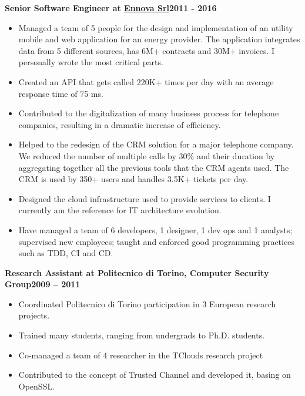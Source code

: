 \documentclass[a4paper,sans,10pt]{moderncv} %
\begin{document}
\vspace{0.5em}
\textbf{Senior Software Engineer at \href{https://www.ennova.it}{Ennova Srl}}\hfill\textbf{2011 - 2016}\\
\vspace{-1em}
  \begin{itemize}
  \item Managed a team of 5 people for the design and implementation of an utility mobile and web application for an energy provider.
  The application integrates data from 5 different sources, has 6M+ contracts and 30M+ invoices.
  I personally wrote the most critical parts.
  \item Created an API that gets called 220K+ times per day with an average response time of 75 ms.
  \item Contributed to the digitalization of many business process for telephone companies, resulting in a dramatic
  increase of efficiency.
  \item Helped to the redesign of the CRM solution for a major telephone company. We reduced the number of multiple calls by 30\%
  and their duration by aggregating together all the previous tools that the CRM agents used. The CRM is used by 350+ users and handles 3.5K+ tickets per day.
  \item Designed the cloud infrastructure used to provide services to clients. I currently am the reference for IT architecture evolution.
  \item Have managed a team of 6 developers, 1 designer, 1 dev ops and 1 analysts; supervised new employees; taught and enforced good programming practices such as TDD, CI and CD.
  \end{itemize}

\vspace{0.5em}
  \textbf{Research Assistant at Politecnico di Torino, Computer Security Group}\hfill\textbf{2009 -- 2011}\\
\vspace{-1em}
  \begin{itemize}
  \item Coordinated Politecnico di Torino participation in 3 European research projects.
  \item Trained many students, ranging from undergrads to Ph.D. students.
  \item Co-managed a team of 4 researcher in the TClouds research project%
  \item Contributed to the concept of Trusted Channel and developed it, basing on OpenSSL.
  \end{itemize}
\end{document}
